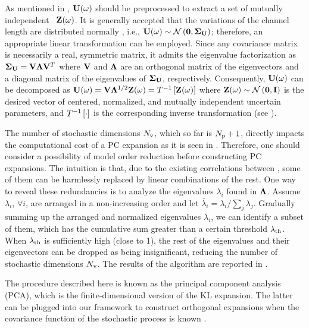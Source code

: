 As mentioned in , $\mathbf{U}(\omega)$ should be preprocessed to extract a set of mutually independent \rvs\ $\mathbf{Z}(\omega)$. It is generally accepted that the variations of the channel length are distributed normally \cite{juan2011, juan2012, srivastava2010}, i.e., $\vU(\o) \sim \normal{\vZero}{\mCov_\vU}$; therefore, an appropriate linear transformation can be employed. Since any covariance matrix is necessarily a real, symmetric matrix, it admits the eigenvalue factorization \cite{press2007} as $\mCov_\vU = \m{V} \m{\Lambda} \m{V}^T$ where $\m{V}$ and $\m{\Lambda}$ are an orthogonal matrix of the eigenvectors and a diagonal matrix of the eigenvalues of $\mCov_\vU$, respectively. Consequently, $\mathbf{U}(\omega)$ can be decomposed as $\vU(\o) = \m{V} \m{\Lambda}^\ifrac{1}{2} \vZ(\o) = \oInvTransform{\vZ(\o)}$ where $\vZ(\o) \sim \normal{\vZero}{\mI}$ is the desired vector of centered, normalized, and mutually independent uncertain parameters, and $T^{-1}\left[\cdot\right]$ is the corresponding inverse transformation (see ).

The number of stochastic dimensions ${N_\text{v}}$, which so far is ${N_\text{p}} + 1$, directly impacts the computational cost of a PC expansion as it is seen in . Therefore, one should consider a possibility of model order reduction before constructing PC expansions. The intuition is that, due to the existing correlations between \rvs, some of them can be harmlessly replaced by linear combinations of the rest. One way to reveal these redundancies is to analyze the eigenvalues $\lambda_i$ found in $\m{\Lambda}$. Assume $\lambda_i$, $\forall i$, are arranged in a non-increasing order and let $\bar{\lambda}_i = \lambda_i / \sum_j \lambda_j$. Gradually summing up the arranged and normalized eigenvalues $\bar{\lambda}_i$, we can identify a subset of them, which has the cumulative sum greater than a certain threshold $\lambda_\text{th}$. When $\lambda_\text{th}$ is sufficiently high (close to 1), the rest of the eigenvalues and their eigenvectors can be dropped as being insignificant, reducing the number of stochastic dimensions ${N_\text{v}}$. The results of the algorithm are reported in .

The procedure described here is known as the principal component analysis (PCA), which is the finite-dimensional version of the KL expansion. The latter can be plugged into our framework to construct orthogonal expansions when the covariance function of the stochastic process is known \cite{xiu2010, maitre2010}.
